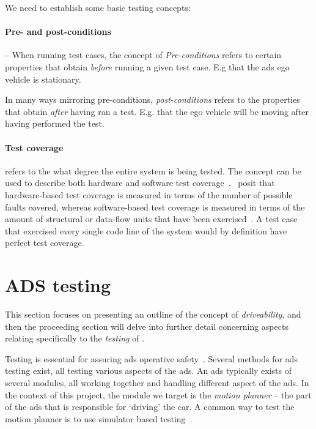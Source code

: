 We need to establish some basic testing concepts:

\paragraph{Pre- and post-conditions} -- When running test cases, the concept of \textit{Pre-conditions}
refers to certain properties that
obtain \textit{before} running a given test case. E.g that the \acrshort{ads} ego vehicle is
stationary.

In many ways mirroring pre-conditions, \textit{post-conditions} refers to the properties that obtain
\textit{after} having ran a test. E.g. that the ego vehicle will be moving after having performed
the test.



\paragraph{Test coverage} refers to the what degree the entire system is being tested. The concept can
be used to describe both hardware and software test
coverage~\cite[187]{testCoverage94}.~\citeauthor{testCoverage94} posit that hardware-based test
coverage is measured in terms of the number of possible faults covered, whereas software-based test
coverage is measured in terms of the amount of structural or data-flow units that have been
exercised~\cite[187]{testCoverage94}. A test case that exercised every single code line of the
system would by definition have perfect test coverage.

\section{ADS testing}

This section focuses on presenting an outline of the concept of
\emph{driveability}, and then the proceeding section will delve into further
detail concerning aspects relating specifically to the \emph{testing} of .

Testing is essential for assuring \acrshort{ads} operative safety~\cite[163]{ADTestingReview16}.
Several methods for \acrshort{ads} testing exist, all testing various aspects of the \acrshort{ads}. An \acrshort{ads}
typically exists of several modules, all working together and handling different aspect of the
\acrshort{ads}.
In the context of this project, the module we target is the \emph{motion
    planner} -- the part of the \acrshort{ads} that is responsible for `driving' the car.
A common way to test the motion planner is to use simulator based testing~\cite[1]{DeepScenario}.


